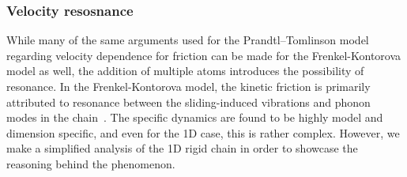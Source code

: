 \subsubsection{Velocity resosnance} %

While many of the same arguments used for the Prandtl–Tomlinson model regarding velocity dependence for friction can be made for the Frenkel-Kontorova model as well, the addition of multiple atoms introduces the possibility of resonance. In the Frenkel-Kontorova model, the kinetic friction is primarily attributed to resonance between the sliding-induced vibrations and phonon modes in the chain~\cite{FK2D}. The specific dynamics are found to be highly model and dimension specific, and even for the 1D case, this is rather complex. However, we make a simplified analysis of the 1D rigid chain in order to showcase the reasoning behind the phenomenon.

